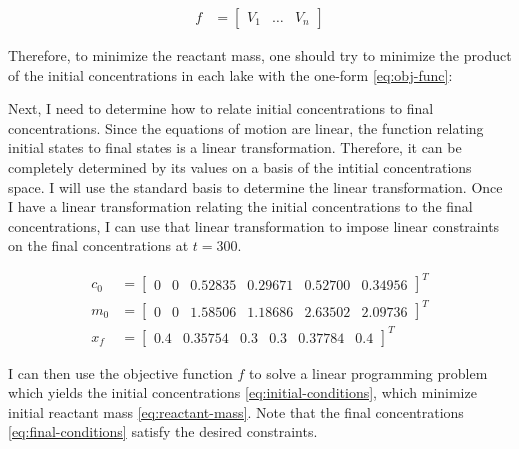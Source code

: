 \documentclass{article}
\begin{document}
\begin{align}
f & = \left[ \begin{matrix} V_1 & \dots & V_n \end{matrix} \right] \label{eq:obj-func} 
\end{align}

Therefore, to minimize the reactant mass, one should try to minimize the product
	of the initial concentrations in each lake with the one-form \ref{eq:obj-func}:

Next, I need to determine how to relate initial concentrations to final concentrations.
Since the equations of motion are linear, the function relating initial states
	to final states is a linear transformation.
Therefore, it can be completely determined by its values on a basis of the 
	intitial concentrations space.
I will use the standard basis to determine the linear transformation.
Once I have a linear transformation relating the initial concentrations to the final
	concentrations, I can use that linear transformation to impose linear constraints
	on the final concentrations at $t = 300$.

\begin{align}
c_0 & = \left[ \begin{matrix} 0 & 0 & 0.52835 & 0.29671 & 0.52700 & 0.34956 
	\end{matrix} \right]^T \label{eq:initial-conditions}\\
m_0 & = \left[ \begin{matrix} 0 & 0 & 1.58506 & 1.18686 & 2.63502 & 2.09736
	\end{matrix} \right]^T \label{eq:reactant-mass}\\
x_f & = \left[ \begin{matrix} 0.4 & 0.35754 & 0.3 & 0.3 & 0.37784 & 0.4 \end{matrix} \right]^T \label{eq:final-conditions} 
\end{align}

I can then use the objective function $f$ to solve a linear programming problem
	which yields the initial concentrations \ref{eq:initial-conditions}, which 
	minimize initial reactant mass \ref{eq:reactant-mass}.
Note that the final concentrations \ref{eq:final-conditions} satisfy the 
	desired constraints.
\end{document}
